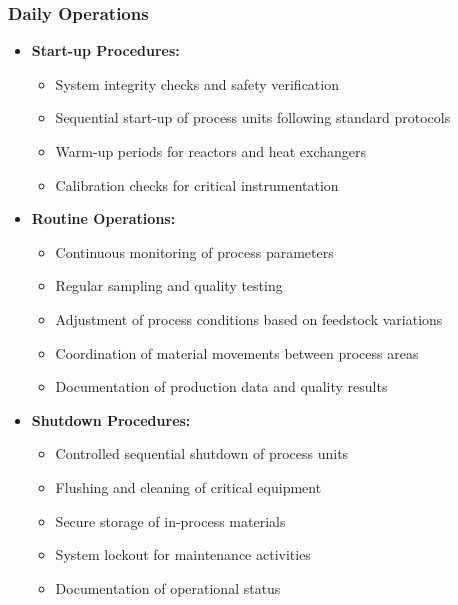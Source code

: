 \subsubsection{Daily Operations}
\begin{itemize}
    \item \textbf{Start-up Procedures:}
    \begin{itemize}
        \item System integrity checks and safety verification
        \item Sequential start-up of process units following standard protocols
        \item Warm-up periods for reactors and heat exchangers
        \item Calibration checks for critical instrumentation
    \end{itemize}
    
    \item \textbf{Routine Operations:}
    \begin{itemize}
        \item Continuous monitoring of process parameters
        \item Regular sampling and quality testing
        \item Adjustment of process conditions based on feedstock variations
        \item Coordination of material movements between process areas
        \item Documentation of production data and quality results
    \end{itemize}
    
    \item \textbf{Shutdown Procedures:}
    \begin{itemize}
        \item Controlled sequential shutdown of process units
        \item Flushing and cleaning of critical equipment
        \item Secure storage of in-process materials
        \item System lockout for maintenance activities
        \item Documentation of operational status
    \end{itemize}
\end{itemize}

